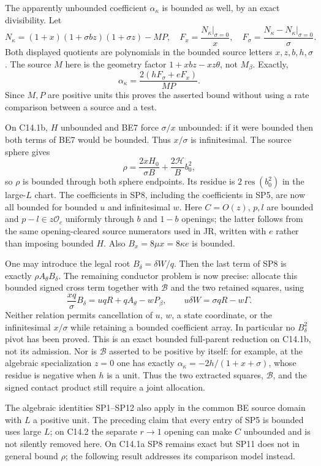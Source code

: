 The apparently unbounded coefficient $\alpha_\kappa$ is bounded as
well, by an exact divisibility. Let
\[
 N_\kappa=(1+x)(1+\sigma bz)(1+\sigma z)-MP,
 \quad F_x=\frac{N_\kappa|_{\sigma=0}}x,
 \quad F_\sigma=\frac{N_\kappa-N_\kappa|_{\sigma=0}}\sigma.
\]
Both displayed quotients are polynomials in the bounded source
letters $x,z,b,h,\sigma$. The source $M$ here is the geometry factor
$1+xbz-xz\theta$, not $M_\beta$. Exactly,
\[
 \alpha_\kappa=\frac{2(hF_\sigma+eF_x)}{MP}.
 \tag{SP10}
\]
Since $M,P$ are positive units this proves the asserted bound without
using a rate comparison between a source and a test.

On C14.1b, $H$ unbounded and BE7 force $\sigma/x$ unbounded:
if it were bounded then both terms of BE7 would be bounded.
Thus $x/\sigma$ is infinitesimal. The source sphere gives
\[
 \rho=\frac{2xH_0}{\sigma B}
                  +\frac{2\mathcal H}{B}b_0^2,
 \tag{SP11}
\]
so $\rho$ is bounded through both sphere endpoints. Its residue is
$2\operatorname{res}(b_0^2)$ in the large-$L$ chart.
The coefficients in SP8, including the coefficients in SP5, are now
all bounded for bounded $u$ and infinitesimal $w$. Here
$C=O(z)$, $p,l$ are bounded and $p-l\in z\mathcal O_c$ uniformly
through $b$ and $1-b$ openings; the latter follows from the same
opening-cleared source numerators used in JR, written with $e$ rather
than imposing bounded $H$. Also $B_x=8\mu x=8\kappa e$ is bounded.

One may introduce the legal root
$B_\delta=\delta W/q$. Then the last term of SP8 is exactly
$\rho A_\theta B_\delta$. The remaining conductor problem is now
precise: allocate this bounded signed cross term together with
$\mathscr B$ and the two retained squares, using
\[
 \frac{xq}{\sigma}B_\delta
       =uqR+qA_\theta-wP_\beta,
 \qquad u\delta W=\sigma qR-w\Gamma.
 \tag{SP12}
\]
Neither relation permits cancellation of $u$, $w$, a state coordinate,
or the infinitesimal $x/\sigma$ while retaining a bounded coefficient
array. In particular no $B_\delta^2$ pivot has been proved. This is
an exact bounded full-parent reduction on C14.1b, not its admission.
Nor is $\mathscr B$ asserted to be positive by itself: for example,
at the algebraic specialization $z=0$ one has exactly
$\alpha_\kappa=-2h/(1+x+\sigma)$, whose residue is negative when
$h$ is a unit. Thus the two extracted squares, $\mathscr B$, and the
signed contact product still require a joint allocation.

The algebraic identities SP1--SP12 also apply in the common BE source
domain with $L$ a positive unit. The preceding claim that every entry
of SP5 is bounded uses large $L$; on C14.2 the separate $r\to1$
opening can make $C$ unbounded and is not silently removed here.
On C14.1a SP8 remains exact but SP11 does not in general bound
$\rho$; the following result addresses its comparison model instead.

